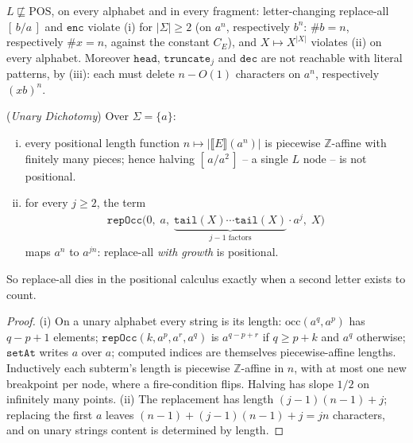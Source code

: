\documentclass[runningheads,envcountsect]{llncs}
\begin{document}
\begin{corollary}
    \label{cor:pos-sep}
    $L \not\sqsubseteq \mathrm{POS}$, on every alphabet and in every fragment: letter-changing replace-all $[\,b/a\,]$ and $\mathtt{enc}$ violate (i) for $|\Sigma| \geq 2$ (on $a^n$, respectively $b^n$: $\#b = n$, respectively $\#x = n$, against the constant $C_E$), and $X \mapsto X^{|X|}$ violates (ii) on every alphabet. Moreover $\mathtt{head}$, $\mathtt{truncate}_j$ and $\mathtt{dec}$ are not reachable with literal patterns, by (iii): each must delete $n - O(1)$ characters on $a^n$, respectively $(xb)^n$.
\end{corollary}

\begin{theorem}
    (\emph{Unary Dichotomy})
    \label{thm:unary}
    Over $\Sigma = \{a\}$:
    \begin{enumerate}[(i)]
        \item every positional length function $n \mapsto \big|\llbracket E \rrbracket(a^n)\big|$ is piecewise $\mathbb{Z}$-affine with finitely many pieces; hence halving $[\,a/a^2\,]$ -- a single $L$ node -- is not positional.
        \item for every $j \geq 2$, the term
        \begin{align}
            \mathtt{repOcc}\big(0,\; a,\; \underbrace{\mathtt{tail}(X)\cdots\mathtt{tail}(X)}_{j-1 \text{ factors}}\cdot a^j,\; X\big)
        \end{align}
        maps $a^n$ to $a^{jn}$: replace-all \emph{with growth} is positional.
    \end{enumerate}
    So replace-all dies in the positional calculus exactly when a second letter exists to count.
\end{theorem}

\begin{proof}
    (i) On a unary alphabet every string is its length: $\mathrm{occ}(a^q, a^p)$ has $q-p+1$ elements; $\mathtt{repOcc}(k, a^p, a^r, a^q)$ is $a^{q-p+r}$ if $q \geq p+k$ and $a^q$ otherwise; $\mathtt{setAt}$ writes $a$ over $a$; computed indices are themselves piecewise-affine lengths. Inductively each subterm's length is piecewise $\mathbb{Z}$-affine in $n$, with at most one new breakpoint per node, where a fire-condition flips. Halving has slope $1/2$ on infinitely many points. (ii) The replacement has length $(j-1)(n-1)+j$; replacing the first $a$ leaves $(n-1) + (j-1)(n-1) + j = jn$ characters, and on unary strings content is determined by length.
\end{proof}
\end{document}
